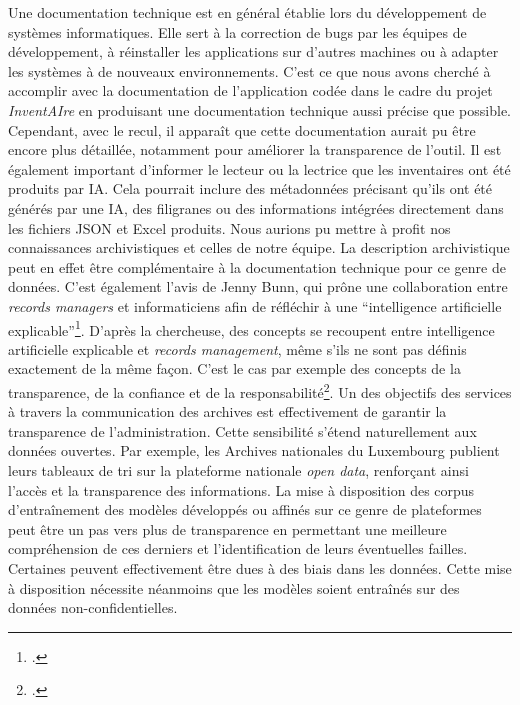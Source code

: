 	Une documentation technique est en général établie lors du développement
	de systèmes informatiques. Elle sert à la correction de bugs par les
	équipes de développement, à réinstaller les applications sur d'autres machines ou
	à adapter les systèmes à de nouveaux environnements. C'est ce que nous
	avons cherché à accomplir avec la documentation de l'application codée
	dans le cadre du projet \emph{InventAIre} en produisant une
	documentation technique aussi précise que possible. Cependant, avec le
	recul, il apparaît que cette documentation aurait pu être encore plus
	détaillée, notamment pour améliorer la transparence de l'outil. Il est
	également important d'informer le lecteur ou la lectrice que les
	inventaires ont été produits par IA. Cela pourrait inclure des
	métadonnées précisant qu'ils ont été générés par une IA, des filigranes
	ou des informations intégrées directement dans les fichiers JSON et
	Excel produits. Nous aurions pu mettre à profit nos connaissances
	archivistiques et celles de notre équipe. La description archivistique
	peut en effet être complémentaire à la documentation technique pour ce
	genre de données. C'est également l'avis de Jenny Bunn, qui prône une
	collaboration entre \emph{records managers} et informaticiens afin de réfléchir
	à une \enquote{intelligence artificielle explicable}\footcite{bunn_working_2020}.
	D'après la chercheuse, des concepts se recoupent entre intelligence
	artificielle explicable et \emph{records management}, même s'ils ne sont pas définis
	exactement de la même façon. C'est le cas par exemple des concepts de la
	transparence, de la confiance et de la responsabilité\footcite{bunn_working_2020}. Un
	des objectifs des services à travers la communication des archives est
	effectivement de garantir la transparence de l'administration. Cette
	sensibilité s'étend naturellement aux données ouvertes. Par exemple, les
	Archives nationales du Luxembourg publient leurs tableaux de tri sur la
	plateforme nationale \emph{open data}, renforçant ainsi l'accès et la
	transparence des informations. La mise à disposition des corpus
	d'entraînement des modèles développés ou affinés sur ce genre de
	plateformes peut être un pas vers plus de transparence en permettant
	une meilleure compréhension de ces derniers et l'identification de leurs
	éventuelles failles. Certaines peuvent effectivement être dues à des biais dans les données.
	Cette mise à disposition nécessite néanmoins que les modèles soient
	entraînés sur des données non-confidentielles.
	
